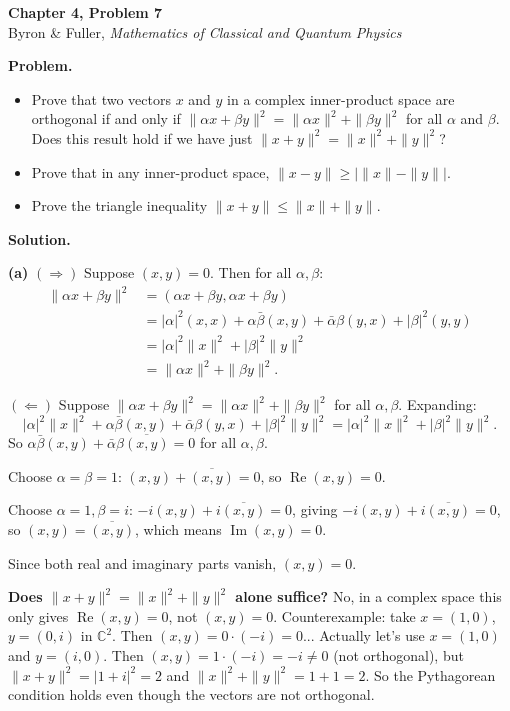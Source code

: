 \documentclass[12pt]{article}
\begin{document}
\begin{center}
{\Large\bfseries Chapter 4, Problem 7}\\[6pt]
Byron \& Fuller, \textit{Mathematics of Classical and Quantum Physics}
\end{center}

\bigskip

\textbf{Problem.}
\begin{itemize}
\item[(a)] Prove that two vectors $x$ and $y$ in a complex inner-product space are orthogonal if and only if $\|\alpha x + \beta y\|^2 = \|\alpha x\|^2 + \|\beta y\|^2$ for all $\alpha$ and $\beta$. Does this result hold if we have just $\|x + y\|^2 = \|x\|^2 + \|y\|^2$?
\item[(b)] Prove that in any inner-product space, $\|x - y\| \geq \big|\|x\| - \|y\|\big|$.
\item[(c)] Prove the triangle inequality $\|x + y\| \leq \|x\| + \|y\|$.
\end{itemize}

\bigskip
\textbf{Solution.}

\textbf{(a)} $(\Rightarrow)$ Suppose $(x, y) = 0$. Then for all $\alpha, \beta$:
\begin{align*}
\|\alpha x + \beta y\|^2 &= (\alpha x + \beta y, \alpha x + \beta y) \\
&= |\alpha|^2(x,x) + \alpha\bar{\beta}(x,y) + \bar{\alpha}\beta(y,x) + |\beta|^2(y,y) \\
&= |\alpha|^2\|x\|^2 + |\beta|^2\|y\|^2 \\
&= \|\alpha x\|^2 + \|\beta y\|^2.
\end{align*}

$(\Leftarrow)$ Suppose $\|\alpha x + \beta y\|^2 = \|\alpha x\|^2 + \|\beta y\|^2$ for all $\alpha, \beta$. Expanding:
\[
|\alpha|^2\|x\|^2 + \alpha\bar{\beta}(x,y) + \bar{\alpha}\beta(y,x) + |\beta|^2\|y\|^2 = |\alpha|^2\|x\|^2 + |\beta|^2\|y\|^2.
\]
So $\alpha\bar{\beta}(x,y) + \bar{\alpha}\beta\overline{(x,y)} = 0$ for all $\alpha, \beta$.

Choose $\alpha = \beta = 1$: $(x,y) + \overline{(x,y)} = 0$, so $\operatorname{Re}(x,y) = 0$.

Choose $\alpha = 1, \beta = i$: $-i(x,y) + i\overline{(x,y)} = 0$, giving $-i(x,y) + i\overline{(x,y)} = 0$, so $(x,y) = \overline{(x,y)}$, which means $\operatorname{Im}(x,y) = 0$.

Since both real and imaginary parts vanish, $(x,y) = 0$.

\textbf{Does $\|x+y\|^2 = \|x\|^2 + \|y\|^2$ alone suffice?} No, in a complex space this only gives $\operatorname{Re}(x,y) = 0$, not $(x,y) = 0$. Counterexample: take $x = (1, 0)$, $y = (0, i)$ in $\mathbb{C}^2$. Then $(x,y) = 0 \cdot (-i) = 0$... Actually let's use $x = (1,0)$ and $y = (i, 0)$. Then $(x,y) = 1\cdot(-i) = -i \neq 0$ (not orthogonal), but $\|x+y\|^2 = |1+i|^2 = 2$ and $\|x\|^2 + \|y\|^2 = 1 + 1 = 2$. So the Pythagorean condition holds even though the vectors are not orthogonal.
\end{document}

